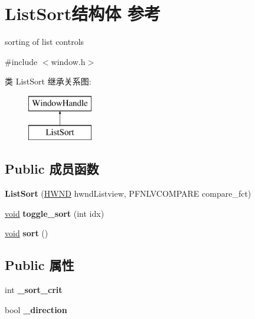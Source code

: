 \hypertarget{struct_list_sort}{}\section{List\+Sort结构体 参考}
\label{struct_list_sort}


sorting of list controls  




{\ttfamily \#include $<$window.\+h$>$}

类 List\+Sort 继承关系图\+:\begin{figure}[H]
\begin{center}
\leavevmode
\includegraphics[height=2.000000cm]{struct_list_sort}
\end{center}
\end{figure}
\subsection*{Public 成员函数}
\begin{DoxyCompactItemize}
\item 
\mbox{\label{struct_list_sort_a917f7deef8bdba983c9a75c097a1ba69}} 
{\bfseries List\+Sort} (\hyperlink{interfacevoid}{H\+W\+ND} hwnd\+Listview, P\+F\+N\+L\+V\+C\+O\+M\+P\+A\+RE compare\+\_\+fct)
\item 
\mbox{\label{struct_list_sort_a890e203afbdddad367d6e22b3bfb4d5d}} 
\hyperlink{interfacevoid}{void} {\bfseries toggle\+\_\+sort} (int idx)
\item 
\mbox{\label{struct_list_sort_ace1b92ecb27ca1018694b2f6f1ea863b}} 
\hyperlink{interfacevoid}{void} {\bfseries sort} ()
\end{DoxyCompactItemize}
\subsection*{Public 属性}
\begin{DoxyCompactItemize}
\item 
\mbox{\label{struct_list_sort_aee3c22320a46f2f7700163a1505274ec}} 
int {\bfseries \+\_\+sort\+\_\+crit}
\item 
\mbox{\label{struct_list_sort_a0af607ca474d27eccbeeca7c31c31aeb}} 
bool {\bfseries \+\_\+direction}
\end{DoxyCompactItemize}
